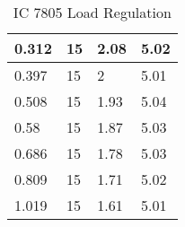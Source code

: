 \documentclass{scrartcl}
\newcommand{\1}{\mathbbm{1}}
\begin{document}
\begin{itemize}
\begin{table}[!htb]
\begin{minipage}{.45\linewidth}
\begin{tabular}{|l|l|l|l|}
        0.312 & 15 & 2.08 & 5.02 \\ \hline
        0.397 & 15 & 2 & 5.01 \\ \hline
        0.508 & 15 & 1.93 & 5.04 \\ \hline
        0.58 & 15 & 1.87 & 5.03 \\ \hline
        0.686 & 15 & 1.78 & 5.03 \\ \hline
        0.809 & 15 & 1.71 & 5.02 \\ \hline
        1.019 & 15 & 1.61 & 5.01 \\ \hline
    \end{tabular}
    \caption{IC 7805 Load Regulation}
	\label{tab:icload}
    \end{minipage} 
\end{table}



\end{itemize}
\end{document}
